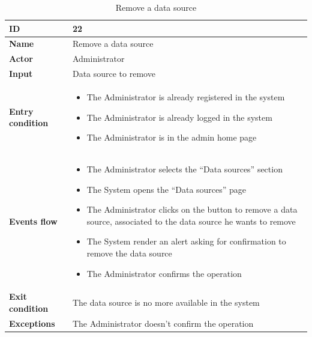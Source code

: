     \begin{longtable}{p{} | p{}}
     \caption{Remove a data source}
        \label{tab:remove_data_source}\\
        
        \hline
        \textbf{ID} & 22\\
        \hline
        \textbf{Name}  &  Remove a data source\\
        \hline
        \textbf{Actor}  &  Administrator\\
        \hline
        \textbf{Input}  &  Data source to remove\\
        \hline
        \textbf{Entry condition}  &  
        \begin{itemize}
                \item The Administrator is already registered in the system
                \item The Administrator is already logged in the system
                \item The Administrator is in the admin home page
         \end{itemize}\\
        \hline
        \textbf{Events flow} & 
        \begin{itemize}
                \item The Administrator selects the “Data sources” section
                \item The System opens the “Data sources” page
                \item The Administrator clicks on the button to remove a data source, associated to the data source he wants to remove
                \item The System render an alert asking for confirmation to remove the data source
                \item The Administrator confirms the operation 
                 \end{itemize}
                 \\
        \hline
        \textbf{Exit condition} & The data source is no more available in the system\\
        \hline
        \textbf{Exceptions} &  The Administrator doesn’t confirm the operation\\
        \hline
       
       
    \end{longtable}
    
